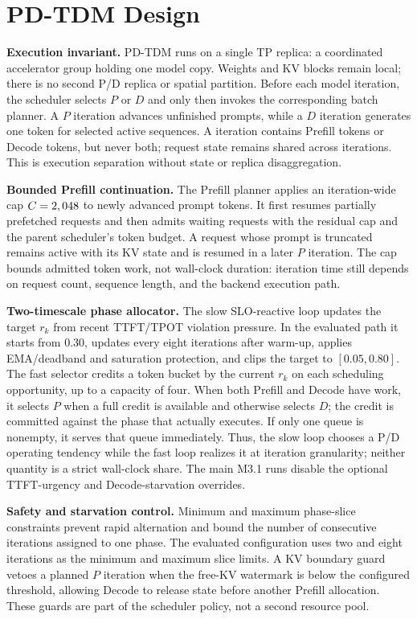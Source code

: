 \section{PD-TDM Design}
\label{sec:design}

\textbf{Execution invariant.}
PD-TDM runs on a single TP replica: a coordinated accelerator group holding
one model copy. Weights and KV blocks remain local; there is no second P/D
replica or spatial partition. Before each model iteration,
the scheduler selects $P$ or $D$ and only then invokes the corresponding batch
planner. A $P$ iteration advances unfinished prompts, while a $D$ iteration
generates one token for selected active sequences. A \phasepure{} iteration
contains Prefill tokens or Decode tokens, but never both; request state remains
shared across iterations. This is execution separation without state or replica
disaggregation.

\textbf{Bounded Prefill continuation.}
The Prefill planner applies an iteration-wide cap $C=2,048$ to newly
advanced prompt tokens. It first resumes partially prefetched requests and then
admits waiting requests with the residual cap and the parent scheduler's token
budget. A request whose prompt is truncated remains active with its KV state and
is resumed in a later $P$ iteration. The cap bounds admitted token work, not
wall-clock duration: iteration time still depends on request count, sequence
length, and the backend execution path.

\textbf{Two-timescale phase allocator.}
The slow SLO-reactive loop updates the target $r_k$ from recent TTFT/TPOT
violation pressure. In the evaluated path it starts from $0.30$, updates every
eight iterations after warm-up, applies EMA/deadband and saturation protection,
and clips the target to $[0.05,0.80]$. The fast selector credits a token bucket
by the current $r_k$ on each scheduling opportunity, up to a capacity of four.
When both Prefill and Decode have work, it selects $P$ when a full credit is
available and otherwise selects $D$; the credit is committed against the phase
that actually executes. If only one queue is nonempty, it serves that queue
immediately. Thus, the slow loop chooses a P/D operating tendency while the
fast loop realizes it at iteration granularity; neither quantity is a strict
wall-clock share. The main M3.1 runs disable the optional TTFT-urgency and
Decode-starvation overrides.

\textbf{Safety and starvation control.}
Minimum and maximum phase-slice constraints prevent rapid alternation and bound
the number of consecutive iterations assigned to one phase. The evaluated
configuration uses two and eight iterations as the minimum and maximum slice
limits. A KV boundary guard vetoes a planned $P$ iteration when the free-KV
watermark is below the configured threshold, allowing Decode to release state
before another Prefill allocation. These guards are part of the scheduler
policy, not a second resource pool.

